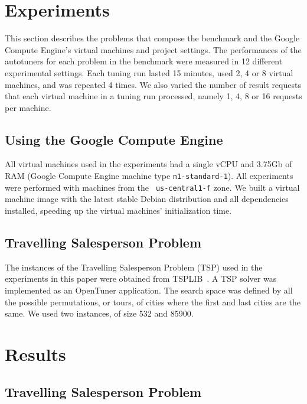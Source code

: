 \documentclass[12pt]{article}
\begin{document}
\section{Experiments} \label{sec:exp}

This section describes the problems that compose the benchmark and the Google
Compute Engine's virtual machines and project settings.  The performances of
the autotuners for each problem in the benchmark were measured in 12 different
experimental settings. Each tuning run lasted 15 minutes, used 2, 4 or 8
virtual machines, and was repeated 4 times.  We also varied the number of
result requests that each virtual machine in a tuning run processed, namely 1,
4, 8 or 16 requests per machine.

\subsection{Using the Google Compute Engine}

All virtual machines used in the experiments had a single vCPU and 3.75Gb of
RAM (Google Compute Engine machine type \texttt{\footnotesize n1-standard-1}).
All experiments were performed with machines from the \texttt{\footnotesize
us-central1-f} zone. We built a virtual machine image with the latest stable
Debian distribution and all dependencies installed, speeding up the virtual
machines' initialization time.

\subsection{Travelling Salesperson Problem}

The instances of the Travelling Salesperson Problem (TSP) used in the
experiments in this paper were obtained from TSPLIB~\cite{reinelt1991tsplib}.
A TSP solver was implemented as an OpenTuner application. The search space was
defined by all the possible permutations, or tours, of cities where the first
and last cities are the same. We used two instances, of size 532 and 85900.

\section{Results} \label{sec:results}


\subsection{Travelling Salesperson Problem}
\end{document}
